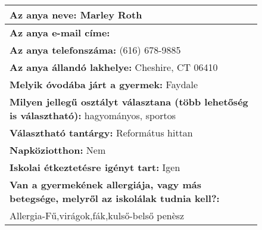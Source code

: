 \documentclass[10pt,a4paper]{article}
\begin{document}
\begin{figure}[!ht]
\begin{tabular}{|m{\textwidth}|}
\hline\vspace{3pt}
\textbf{Az anya neve:} \hspace{0.5cm} Marley Roth \vspace{3pt} \\
\hline\vspace{3pt}
\textbf{Az anya e-mail címe:} \hspace{0.5cm}   \vspace{3pt} \\
\hline\vspace{3pt}
\textbf{Az anya telefonszáma:} \hspace{0.5cm} (616) 678-9885 \vspace{3pt} \\
\hline\vspace{3pt}
\textbf{Az anya állandó lakhelye:} \hspace{0.5cm} Cheshire, CT 06410 \vspace{3pt} \\
\hline\vspace{3pt}
\textbf{Melyik óvodába járt a gyermek:} \hspace{0.5cm} Faydale \vspace{3pt} \\
\hline\vspace{3pt}
\textbf{Milyen jellegű osztályt választana (több lehetőség is választható):} \hspace{0.5cm} hagyományos, sportos \vspace{3pt} \\
\hline\vspace{3pt}
\textbf{Választható tantárgy:} \hspace{0.5cm} Református hittan \vspace{3pt} \\
\hline\vspace{3pt}
\textbf{Napköziotthon:} \hspace{0.5cm} Nem \vspace{3pt} \\
\hline\vspace{3pt}
\textbf{Iskolai étkeztetésre igényt tart:} \hspace{0.5cm} Igen \vspace{3pt} \\
\hline\vspace{3pt}
\textbf{Van a gyermekének allergiája, vagy más betegsége, melyről az iskolálak tudnia kell?:} \\ \hspace{0.5cm} Allergia-Fű,virágok,fák,kulső-belső penèsz \vspace{3pt} \\

\end{tabular}
\end{figure}
\end{document}
